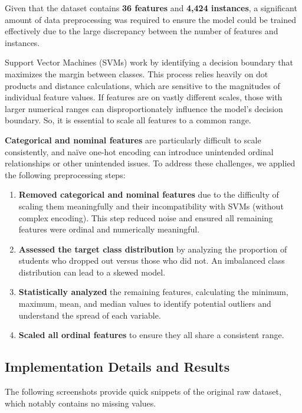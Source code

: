 \documentclass[12pt]{article}
\begin{document}
Given that the dataset contains \textbf{36 features} and \textbf{4,424 instances}, a significant amount of data preprocessing was required to ensure the model could be trained effectively due to the large discrepancy between the number of features and instances. 

Support Vector Machines (SVMs) work by identifying a decision boundary that maximizes the margin between classes. This process relies heavily on dot products and distance calculations, which are sensitive to the magnitudes of individual feature values. If features are on vastly different scales, those with larger numerical ranges can disproportionately influence the model’s decision boundary. So, it is essential to scale all features to a common range.

\textbf{Categorical and nominal features} are particularly difficult to scale consistently, and naïve one-hot encoding can introduce unintended ordinal relationships or other unintended issues. To address these challenges, we applied the following preprocessing steps:

\begin{enumerate}
    \item \textbf{Removed categorical and nominal features} due to the difficulty of scaling them meaningfully and their incompatibility with SVMs (without complex encoding). This step reduced noise and ensured all remaining features were ordinal and numerically meaningful.
    \item \textbf{Assessed the target class distribution} by analyzing the proportion of students who dropped out versus those who did not. An imbalanced class distribution can lead to a skewed model.
    \item \textbf{Statistically analyzed} the remaining features, calculating the minimum, maximum, mean, and median values to identify potential outliers and understand the spread of each variable.
    \item \textbf{Scaled all ordinal features} to ensure they all share a consistent range.
\end{enumerate}

\subsection{Implementation Details and Results}

The following screenshots provide quick snippets of the original raw dataset, which notably contains no missing values.
\end{document}
